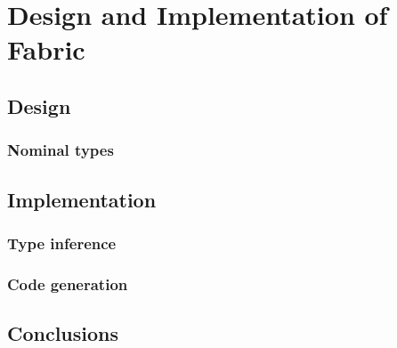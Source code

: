 \chapter{Design and Implementation of Fabric}
\label{fabric}

\section{Design}

\subsection{Nominal types}

\section{Implementation}

\subsection{Type inference}

\subsection{Code generation}

\section{Conclusions}
